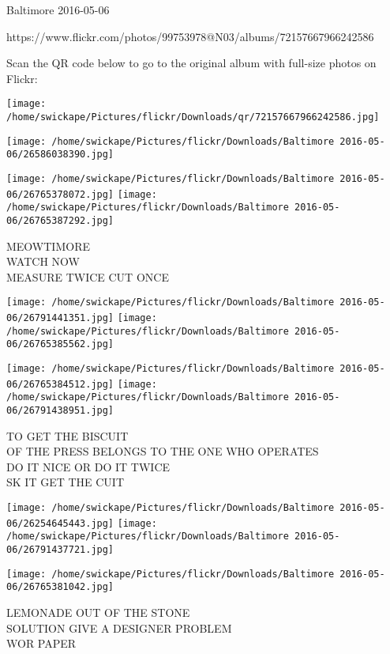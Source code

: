 \documentclass[10pt,letterpaper]{article}
\begin{document}
Baltimore 2016-05-06

https://www.flickr.com/photos/99753978@N03/albums/72157667966242586

Scan the QR code below to go to the original album with full-size photos on Flickr:

\texttt{[image: /home/swickape/Pictures/flickr/Downloads/qr/72157667966242586.jpg]}
\pagebreak

\texttt{[image: /home/swickape/Pictures/flickr/Downloads/Baltimore 2016-05-06/26586038390.jpg]}

\vspace{0.25in}
\texttt{[image: /home/swickape/Pictures/flickr/Downloads/Baltimore 2016-05-06/26765378072.jpg]}
\texttt{[image: /home/swickape/Pictures/flickr/Downloads/Baltimore 2016-05-06/26765387292.jpg]}

MEOWTIMORE\\
WATCH NOW\\
MEASURE TWICE CUT ONCE\\
\pagebreak

\texttt{[image: /home/swickape/Pictures/flickr/Downloads/Baltimore 2016-05-06/26791441351.jpg]}
\texttt{[image: /home/swickape/Pictures/flickr/Downloads/Baltimore 2016-05-06/26765385562.jpg]}

\texttt{[image: /home/swickape/Pictures/flickr/Downloads/Baltimore 2016-05-06/26765384512.jpg]}
\texttt{[image: /home/swickape/Pictures/flickr/Downloads/Baltimore 2016-05-06/26791438951.jpg]}

TO GET THE BISCUIT\\
OF THE PRESS BELONGS TO THE ONE WHO OPERATES\\
DO IT NICE OR DO IT TWICE\\
SK IT GET THE CUIT\\
\pagebreak

\texttt{[image: /home/swickape/Pictures/flickr/Downloads/Baltimore 2016-05-06/26254645443.jpg]}
\texttt{[image: /home/swickape/Pictures/flickr/Downloads/Baltimore 2016-05-06/26791437721.jpg]}

\texttt{[image: /home/swickape/Pictures/flickr/Downloads/Baltimore 2016-05-06/26765381042.jpg]}

LEMONADE OUT OF THE STONE\\
SOLUTION GIVE A DESIGNER PROBLEM\\
WOR PAPER\\
\pagebreak
\end{document}
